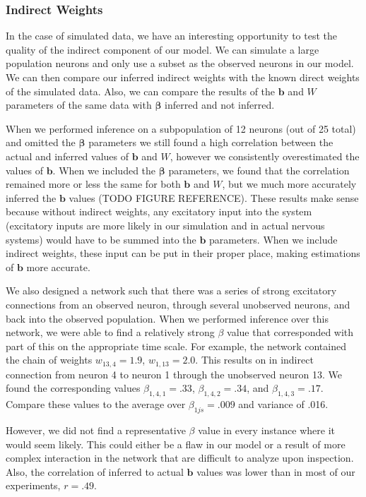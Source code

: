 \documentclass{article}
\begin{document}
\subsubsection{Indirect Weights}

In the case of simulated data, we have an interesting opportunity to test the quality of the indirect component of our model. We can simulate a large population neurons and only use a subset as the observed neurons in our model. We can then compare our inferred indirect weights with the known direct weights of the simulated data. Also, we can compare the results of the $\mathbf{b}$ and $W$ parameters of the same data with $\bm{\beta}$ inferred and not inferred.

When we performed inference on a subpopulation of 12 neurons (out of 25 total) and omitted the $\bm{\beta}$ parameters we still found a high correlation between the actual and inferred values of $\mathbf{b}$ and $W$, however we consistently overestimated the values of $\mathbf{b}$. When we included the $\bm{\beta}$ parameters, we found that the correlation remained more or less the same for both $\mathbf{b}$ and $W$, but we much more accurately inferred the $\mathbf{b}$ values (TODO FIGURE REFERENCE). These results make sense because without indirect weights, any excitatory input into the system (excitatory inputs are more likely in our simulation and in actual nervous systems) would have to be summed into the $\mathbf{b}$ parameters. When we include indirect weights, these input can be put in their proper place, making estimations of $\mathbf{b}$ more accurate. 

We also designed a network such that there was a series of strong excitatory connections from an observed neuron, through several unobserved neurons, and back into the observed population.  When we performed inference over this network, we were able to find a relatively strong $\beta$ value that corresponded with part of this on the appropriate time scale. For example, the network contained the chain of weights $w_{13,4}=1.9$, $w_{1,13}=2.0$. This results on in indirect connection from neuron 4 to neuron 1 through the unobserved neuron 13. We found the corresponding values $\beta_{1,4,1}=.33$, $\beta_{1,4,2}=.34$, and $\beta_{1,4,3}=.17$. Compare these values to the average over $\beta_{1js}=.009$ and variance of .016.

However, we did not find a representative $\beta$ value in every instance where it would seem likely. This could either be a flaw in our model or a result of more complex interaction in the network that are difficult to analyze upon inspection. Also, the correlation of inferred to actual $\mathbf{b}$ values was lower than in most of our experiments, $r=.49$.
\end{document}
